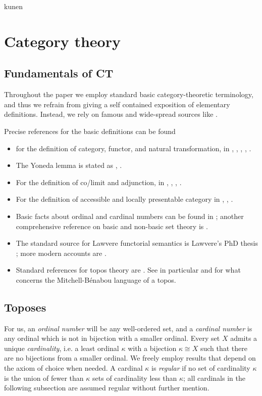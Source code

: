 kunen\section{Category theory}
\subsection{Fundamentals of CT}
Throughout the paper we employ standard basic category-theoretic terminology, and thus we refrain from giving a self contained exposition of elementary definitions. Instead, we rely on famous and wide-spread sources like \cite{Bor1,Bor2,McL,riehlcontext,leinster2014basic,simmons2011introduction}.

Precise references for the basic definitions can be found
\begin{itemize}
	\item for the definition of category, functor, and natural transformation, in \cite[1.2.1]{Bor1}, \cite[I.2]{McL}, \cite[1.2.2]{Bor1}, \cite[I.3]{McL}, \cite[1.3.1]{Bor1}.
	\item The Yoneda lemma is stated as \cite[1.3.3]{Bor1}, \cite[III.2]{McL}.
	\item For the definition of co/limit and adjunction, in \cite[2.6.2]{Bor1}, \cite[III.3]{McL}, \cite[2.6.6]{Bor1}, \cite[III.4]{McL}.
	\item For the definition of accessible and locally presentable category in \cite[5.3.1]{Bor2}, \cite[5.2.1]{Bor2}, \cite{Adamek1994}.%
	\item Basic facts about ordinal and cardinal numbers can be found in \cite{kunen}; another comprehensive reference on basic and non-basic set theory is \cite{jech2013set}.
	\item The standard source for Lawvere functorial semantics is Lawvere's PhD thesis \cite{lawvere1963functorial}; more modern accounts are \cite{hyland2007category}.
	\item Standard references for topos theory are \cite{mac1992sheaves,JohnstonePT}. See in particular \cite[VI.5]{mac1992sheaves} and \cite[5.4]{JohnstonePT} for what concerns the Mitchell-Bénabou language of a topos.
\end{itemize}
\subsection{Toposes}\leavevmode
For us, an \emph{ordinal number} will be any well\hyp{}ordered set, and a \emph{cardinal number} is any ordinal which is not in bijection with a smaller ordinal. Every set $X$ admits a unique \emph{cardinality}, i.e. a least ordinal $\kappa$ with a bijection $\kappa \cong X$ such that there are no bijections from a smaller ordinal. We freely employ results that depend on the axiom of choice when needed. A cardinal $\kappa$ is \emph{regular} if no set of cardinality $\kappa$ is the union of fewer than $\kappa$ sets of cardinality less than $\kappa$; all cardinals in the following subsection are assumed regular without further mention.

